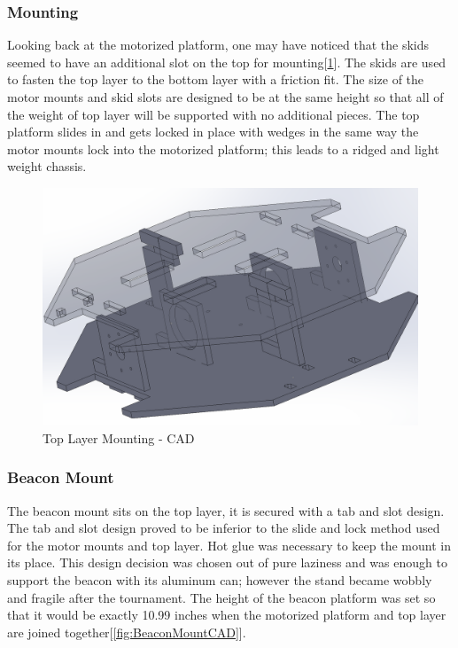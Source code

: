 \documentclass{article}
\begin{document}
\subsubsection{Mounting}
Looking back at the motorized platform, one may have noticed that the skids seemed to have an additional slot on the top for mounting[\ref{fig:TopLayerMountingCAD}]. The skids are used to fasten the top layer to the bottom layer with a friction fit. The size of the motor mounts and skid slots are designed to be at the same height so that all of the weight of top layer will be supported with no additional pieces. The top platform slides in and gets locked in place with wedges in the same way the motor mounts lock into the motorized platform; this leads to a ridged and light weight chassis.

\begin{figure}[H]
    \centering
    \includegraphics[width = 5in]{TopLayerMounting.PNG}
    \caption{Top Layer Mounting - CAD}
    \label{fig:TopLayerMountingCAD}
\end{figure}

\subsubsection{Beacon Mount}
The beacon mount sits on the top layer, it is secured with a tab and slot design. The tab and slot design proved to be inferior to the slide and lock method used for the motor mounts and top layer. Hot glue was necessary to keep the mount in its place. This design decision was chosen out of pure laziness and was enough to support the beacon with its aluminum can; however the stand became wobbly and fragile after the tournament. The height of the beacon platform was set so that it would be exactly 10.99 inches when the motorized platform and top layer are joined together[\ref{fig:BeaconMountCAD}].
\end{document}
